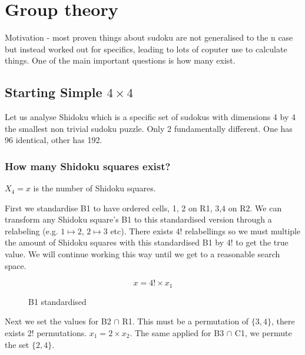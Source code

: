 \documentclass[a4paper,11pt]{report}
\newcounter{row}
\newcounter{col}
\newcounter{rowa}
\newcounter{cola}
\newcommand\setrowa[4]{
  \setcounter{cola}{1}
  \foreach \n in {#1, #2, #3, #4} {
    \edef\x{\value{cola} - 0.5}
    \edef\y{4.5 - \value{rowa}}
    \node[anchor=center] at (\x, \y) {\n};
    \stepcounter{cola}
  }
  \stepcounter{rowa}
}
\begin{document}
\chapter{Group theory}
Motivation - most proven things about sudoku are not generalised to the n case but instead worked out for specifics, leading to lots of coputer use to calculate things.
One of the main important questions is how many exist.

\section{Starting Simple $4 \times 4$}
Let us analyse Shidoku which is a specific set of sudokus with dimensions 4 by 4 the smallest non trivial sudoku puzzle. Only 2 fundamentally different. One has 96 identical, other has 192. 

\subsection{How many Shidoku squares exist?}

$X_4=x$ is the number of Shidoku squares.

First we standardise B1 to have ordered cells, 1, 2 on R1, 3,4 on R2. We can transform any Shidoku square's B1 to this standardised version through a relabeling (e.g. $1 \mapsto 2$, $2\mapsto 3$ etc). There exists 4! relabellings so we must multiple the amount of Shidoku squares with this standardised B1 by 4! to get the true value. We will continue working this way until we get to a reasonable search space.

\begin{equation}
x = 4!\times x_1
\end{equation}

\begin{figure}[h]
\centering
{}
\caption{B1 standardised}
\label{fig:shidokurelabelling}
\end{figure}

Next we set the values for B2 $\cap$ R1. This must be a permutation of $\{3,4\}$, there exists 2! permutations. $x_1 = 2\times x_2$. The same applied for B3 $\cap$ C1, we permute the set $\{2,4\}$. 
\end{document}
